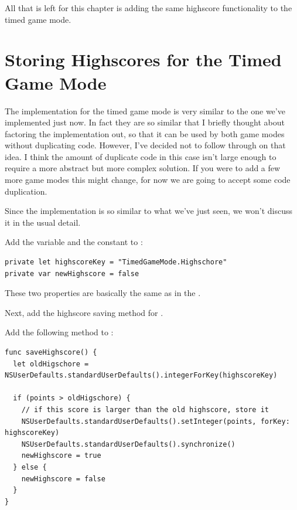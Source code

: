 All that is left for this chapter is adding the same highscore functionality to
the timed game mode.

\section{Storing Highscores for the Timed Game Mode}
The implementation for the timed game mode is very similar to the one we've
implemented just now. In fact they are so similar that I briefly thought about
factoring the implementation out, so that it can be used by both game modes
without duplicating code. However, I've decided not to follow through on that
idea. I think the amount of duplicate code in this case isn't large enough to
require a more abstract but more complex solution. If you were to add a few more
game modes this might change, for now we are going to accept some code
duplication.

Since the implementation is so similar to what we've just seen, we won't discuss
it in the usual detail.

\begin{leftbar}
Add the  variable and the 
constant to :
\begin{lstlisting}
private let highscoreKey = "TimedGameMode.Highschore"
private var newHighscore = false
\end{lstlisting}
\end{leftbar}
These two properties are basically the same as in the
. 

Next, add the highscore saving method for .

\begin{leftbar}
Add the following method to :
\begin{lstlisting}
func saveHighscore() {
  let oldHigschore = NSUserDefaults.standardUserDefaults().integerForKey(highscoreKey)
  
  if (points > oldHigschore) {
    // if this score is larger than the old highscore, store it
    NSUserDefaults.standardUserDefaults().setInteger(points, forKey: highscoreKey)
    NSUserDefaults.standardUserDefaults().synchronize()
    newHighscore = true
  } else {
    newHighscore = false
  }
}
\end{lstlisting}
\end{leftbar}

